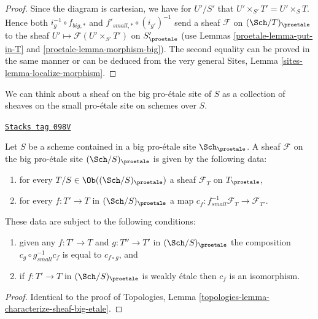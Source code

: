 \begin{proof}

Since the diagram is cartesian, we have for $U'/S'$
that $U' \times_{S'} T' = U' \times_S T$. Hence both
$i_g^{-1} \circ f_{big, *}$ and $f'_{small, *} \circ (i_{g'})^{-1}$
send a sheaf $\mathcal{F}$ on $(\Sch/T)_\proetale$ to the sheaf
$U' \mapsto \mathcal{F}(U' \times_{S'} T')$ on $S'_\proetale$
(use Lemmas \ref{proetale-lemma-put-in-T} and \ref{proetale-lemma-morphism-big}).
The second equality can be proved in the same manner or can be
deduced from the very general
Sites, Lemma \ref{sites-lemma-localize-morphism}.
\end{proof}

We can think about a sheaf on the big pro-\'etale site of $S$ as a collection
of sheaves on the small pro-\'etale site on schemes over $S$.

\begin{lemma}
\label{proetale-lemma-characterize-sheaf-big}
\href{https://stacks.math.columbia.edu/tag/098V}{\texttt{Stacks tag 098V}}

Let $S$ be a scheme contained in a big pro-\'etale site $\Sch_\proetale$.
A sheaf $\mathcal{F}$ on the big pro-\'etale site $(\Sch/S)_\proetale$
is given by the following data:
\begin{enumerate}
\item for every $T/S \in \Ob((\Sch/S)_\proetale)$ a sheaf
$\mathcal{F}_T$ on $T_\proetale$,
\item for every $f : T' \to T$ in
$(\Sch/S)_\proetale$ a map
$c_f : f_{small}^{-1}\mathcal{F}_T \to \mathcal{F}_{T'}$.
\end{enumerate}
These data are subject to the following conditions:
\begin{enumerate}
\item[(a)] given any $f : T' \to T$ and $g : T'' \to T'$ in
$(\Sch/S)_\proetale$ the composition
$c_g \circ g_{small}^{-1}c_f$ is equal to $c_{f \circ g}$, and
\item[(b)] if $f : T' \to T$ in $(\Sch/S)_\proetale$
is weakly \'etale then $c_f$ is an isomorphism.
\end{enumerate}
\end{lemma}

\begin{proof}
Identical to the proof of
Topologies, Lemma \ref{topologies-lemma-characterize-sheaf-big-etale}.
\end{proof}

